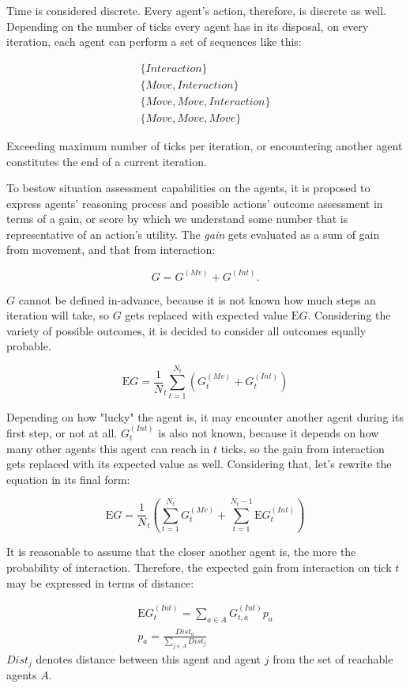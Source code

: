 Time is considered discrete. Every agent's action, therefore, is discrete as well. Depending on the number of ticks
every agent has in its disposal, on every iteration, each agent can perform a set of sequences like this:

$$
    \begin{gathered}
        \{Interaction\}\\
        \{Move, Interaction\}\\
        \{Move, Move, Interaction\}\\
        \{Move, Move, Move\}
    \end{gathered}
$$

Exceeding maximum number of ticks per iteration, or encountering another agent constitutes the end of a current
iteration.

To bestow situation assessment capabilities on the agents, it is proposed to express agents' reasoning process and
possible actions' outcome assessment in terms of a gain, or score by which we understand some number that is
representative of an action's utility. The \textit{gain} gets evaluated as a sum of gain from movement, and that from
interaction:

$$
G = G^{(Mv)} + G^{(Int)}.
$$

$G$ cannot be defined in-advance, because it is not known how much steps an iteration will take, so $G$ gets replaced
with expected value $\mathrm{E}G$. Considering the variety of possible outcomes, it is decided to consider all outcomes
equally probable.

$$
    \mathrm{E}G = \frac 1 N_t \sum_{t=1}^{N_t}{(G^{(Mv)}_t + G^{(Int)}_t)}
$$

Depending on how "lucky" the agent is, it may encounter another agent during its first step, or not at all.
$G^{(Int)}_t$ is also not known, because it depends on how many other agents this agent can reach in $t$ ticks, so the
gain from interaction gets replaced with its expected value as well. Considering that, let's rewrite the equation in its
final form:

\begin{equation}
    \mathrm{E}{G} = \frac 1 N_t (\sum_{t=1}^{N_t}{G^{(Mv)}_t} + \sum_{t=1}^{N_t - 1}{\mathrm{E}G^{(Int)}_t})
\end{equation}

It is reasonable to assume that the closer another agent is, the more the probability of interaction. Therefore, the
expected gain from interaction on tick $t$ may be expressed in terms of distance:

\begin{equation}\label{eq:expected-gain}
    \begin{gathered}
        \mathrm{E}G^{(Int)}_t = \sum_{a \in A}{G^{(Int)}_{t,a}p_{a}}\\
        p_{a} = \frac {Dist_a} {\sum_{j \in A}{Dist_j}}
    \end{gathered}
\end{equation}
$Dist_j$ denotes distance between this agent and agent $j$ from the set of reachable agents $A$.
